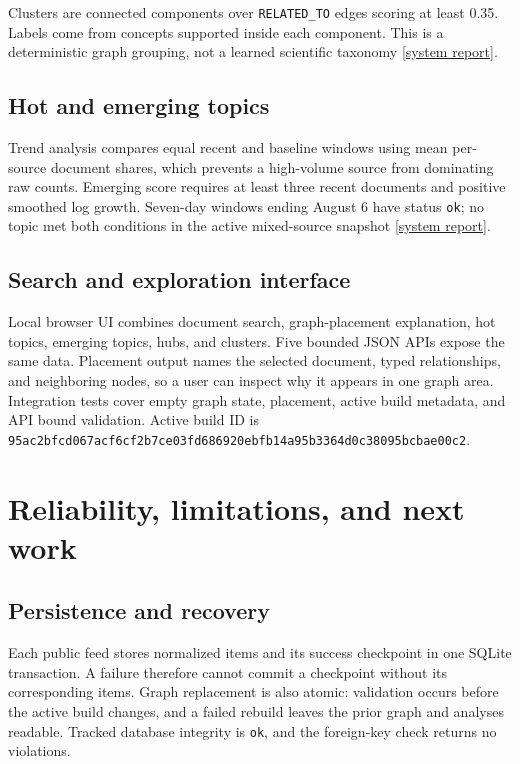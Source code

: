 \documentclass[10pt]{article}
\newcommand{\reposource}[2]{\href{#1}{\textcolor{reportblue}{[#2]}}}
\begin{document}
Clusters are connected components over \texttt{RELATED\_TO} edges scoring at
least 0.35. Labels come from concepts supported inside each component. This is
a deterministic graph grouping, not a learned scientific taxonomy
\reposource{https://github.com/garyzhang1006/paper-fetcher/blob/main/docs/PROJECT_1_SYSTEM_REPORT.md}{system report}.

\subsection{Hot and emerging topics}

Trend analysis compares equal recent and baseline windows using mean
per-source document shares, which prevents a high-volume source from dominating
raw counts. Emerging score requires at least three recent documents and
positive smoothed log growth. Seven-day windows ending August 6 have status
\texttt{ok}; no topic met both conditions in the active mixed-source snapshot
\reposource{https://github.com/garyzhang1006/paper-fetcher/blob/main/docs/PROJECT_1_SYSTEM_REPORT.md}{system report}.

\subsection{Search and exploration interface}

Local browser UI combines document search, graph-placement explanation, hot
topics, emerging topics, hubs, and clusters. Five bounded JSON APIs expose the
same data. Placement output names the selected document, typed relationships,
and neighboring nodes, so a user can inspect why it appears in one graph area.
Integration tests cover empty graph state, placement, active build metadata,
and API bound validation. Active build ID is
\texttt{95ac2bfcd067acf6cf2b7ce03fd686920ebfb14a95b3364d0c38095bcbae00c2}.

\clearpage

\section{Reliability, limitations, and next work}

\subsection{Persistence and recovery}

Each public feed stores normalized items and its success checkpoint in one
SQLite transaction. A failure therefore cannot commit a checkpoint without
its corresponding items. Graph replacement is also atomic: validation occurs
before the active build changes, and a failed rebuild leaves the prior graph
and analyses readable. Tracked database integrity is \texttt{ok}, and the
foreign-key check returns no violations.
\end{document}
